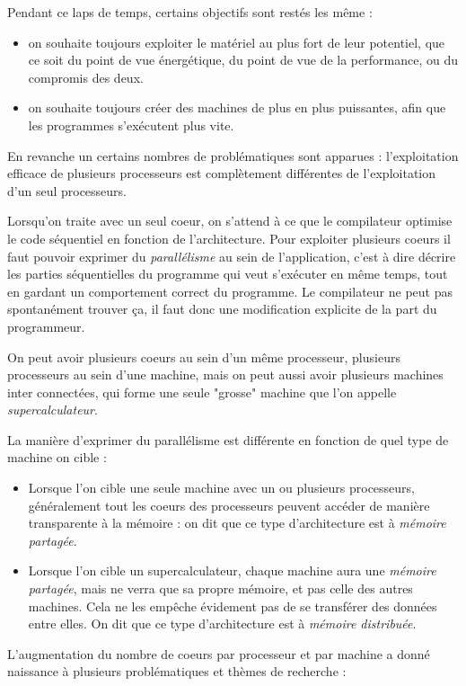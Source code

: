 Pendant ce laps de temps, certains objectifs sont restés les même :
\begin{itemize}
  \item on souhaite toujours exploiter le matériel au plus fort de leur potentiel, que ce soit du point de vue énergétique, du point de vue de la performance, ou du compromis des deux.
  \item on souhaite toujours créer des machines de plus en plus puissantes, afin que les programmes s'exécutent plus vite.
\end{itemize}

En revanche un certains nombres de problématiques sont apparues : l'exploitation efficace de plusieurs processeurs est complètement différentes de l'exploitation d'un seul processeurs.

Lorsqu'on traite avec un seul coeur, on s'attend à ce que le compilateur optimise le code séquentiel en fonction de l'architecture.
Pour exploiter plusieurs coeurs il faut pouvoir exprimer du \emph{parallélisme} au sein de l'application, c'est à dire décrire les parties séquentielles du programme qui veut s'exécuter en même temps, tout en gardant un comportement correct du programme.
Le compilateur ne peut pas spontanément trouver ça, il faut donc une modification explicite de la part du programmeur.

On peut avoir plusieurs coeurs au sein d'un même processeur, plusieurs processeurs au sein d'une machine, mais on peut aussi avoir plusieurs machines inter connectées, qui forme une seule "grosse" machine que l'on appelle \emph{supercalculateur}.

La manière d'exprimer du parallélisme est différente en fonction de quel type de machine on cible :
\begin{itemize}
  \item Lorsque l'on cible une seule machine avec un ou plusieurs processeurs, généralement tout les coeurs des processeurs peuvent accéder de manière transparente à la mémoire : on dit que ce type d'architecture est à \emph{mémoire partagée}.
  \item Lorsque l'on cible un supercalculateur, chaque machine aura une \emph{mémoire partagée}, mais ne verra que sa propre mémoire, et pas celle des autres machines. Cela ne les empêche évidement pas de se transférer des données entre elles. On dit que ce type d'architecture est à \emph{mémoire distribuée}.
\end{itemize}

L'augmentation du nombre de coeurs par processeur et par machine a donné naissance à plusieurs problématiques et thèmes de recherche :

